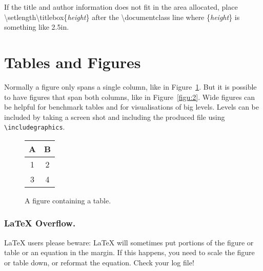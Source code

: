 \documentclass[letterpaper]{article}
\begin{document}
\noindent If the title and author information does not fit in the area allocated, place
\textbackslash setlength\textbackslash titlebox\{\textit{height}\}
after the \textbackslash documentclass line where \{\textit{height}\} is something like 2.5in.


\section{Tables and Figures}
Normally a figure only spans a single column, like in Figure~\ref{figu:1}. But it is possible to have figures that span both columns, like in Figure~\ref{figu:2}. Wide figures can be helpful for benchmark tables and for visualisations of big levels. Levels can be included by taking a screen shot and including the produced file using \verb|\includegraphics|.
\begin{figure}[h]
\begin{center}
\begin{tabular}{|c|c|} \hline
A & B  \\  \hline
1 & 2 \\
3 & 4 \\ \hline
\end{tabular}
\caption{A figure containing a table.}\label{figu:1}
\end{center}
\end{figure}


\subsubsection{\LaTeX{} Overflow.}
\LaTeX{} users please beware: \LaTeX{} will sometimes put portions of the figure or table or an equation in the margin. If this happens, you need to scale the figure or table down, or reformat the equation. Check your log file! 




\end{document}
